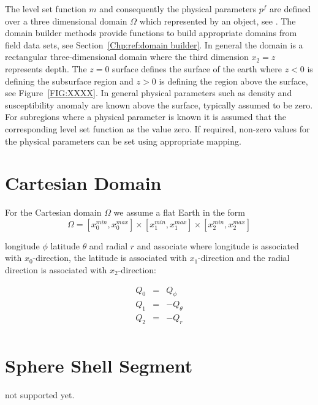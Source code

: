 The level set function $m$ and consequently the physical parameters $p^f$ are 
defined over a three dimensional domain $\Omega$ which represented by an \escript 
{} object, see \cite{ESCRIPT}. The domain builder methods provide 
functions to build appropriate domains from field data sets, see Section~\ref{Chp:ref:domain builder}.
In general the domain is a rectangular three-dimensional domain where the third dimension $x_2=z$ represents
depth. The $z=0$ surface defines the surface of the earth where $z<0$ is defining the subsurface region and
$z>0$ is defining the region above the surface, see Figure~\ref{FIG:XXXX}. In general physical parameters such as
density and susceptibility anomaly are known above the surface, typically assumed to be zero. 
For subregions where a physical parameter is known it is assumed that the corresponding level set function as 
the value zero. If required, non-zero values for the physical parameters can be set using appropriate mapping.      

\section{Cartesian Domain}
For the Cartesian domain $\Omega$ we assume a flat Earth in the form
\begin{equation} \label{REF:EQU:INTRO 8}
\Omega = [x^{min}_0, x^{max}_0] \times
 [x^{min}_1, x^{max}_1] \times
 [x^{min}_2, x^{max}_2] 
\end{equation} 

longitude $\phi$ latitude $\theta$ and radial $r$
and associate where longitude is associated with $x_0$-direction,
the latitude is associated with $x_1$-direction and the radial direction is associated with $x_2$-direction: 

 \begin{equation}\label{REF:EQU:INTRO 9}
\begin{array}{rcl}
Q_0  & = &  Q_{\phi} \\
Q_1  & = & -Q_{\theta} \\
Q_2  & = & -Q_r \\
\end{array}
\end{equation}

\section{Sphere Shell Segment}
not supported yet.

